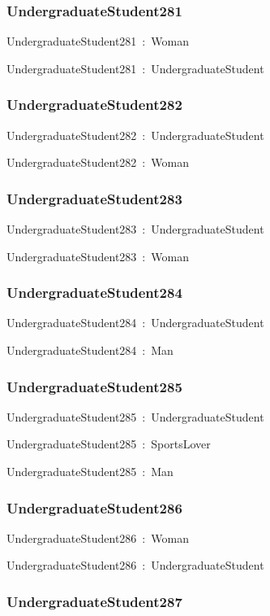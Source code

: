 \documentclass{article}
\begin{document}
\subsubsection*{UndergraduateStudent281}

UndergraduateStudent281~:~Woman

UndergraduateStudent281~:~UndergraduateStudent

\subsubsection*{UndergraduateStudent282}

UndergraduateStudent282~:~UndergraduateStudent

UndergraduateStudent282~:~Woman

\subsubsection*{UndergraduateStudent283}

UndergraduateStudent283~:~UndergraduateStudent

UndergraduateStudent283~:~Woman

\subsubsection*{UndergraduateStudent284}

UndergraduateStudent284~:~UndergraduateStudent

UndergraduateStudent284~:~Man

\subsubsection*{UndergraduateStudent285}

UndergraduateStudent285~:~UndergraduateStudent

UndergraduateStudent285~:~SportsLover

UndergraduateStudent285~:~Man

\subsubsection*{UndergraduateStudent286}

UndergraduateStudent286~:~Woman

UndergraduateStudent286~:~UndergraduateStudent

\subsubsection*{UndergraduateStudent287}
\end{document}
